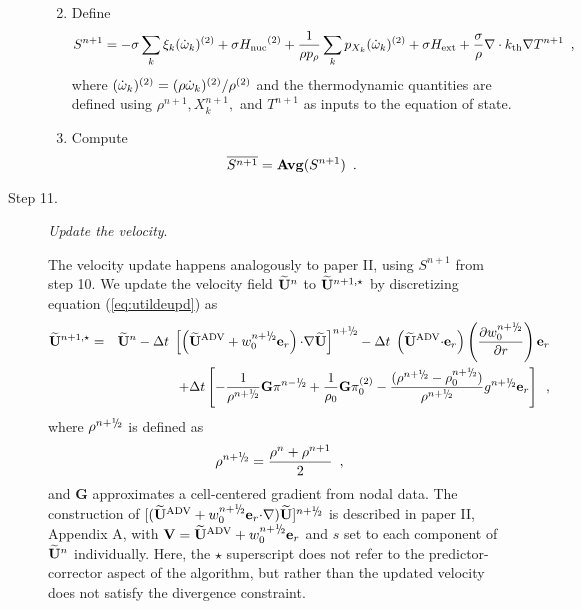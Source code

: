 \begin{description}
\begin{enumerate}
\renewcommand{\theenumi}{{\bf \alph{enumi}}}
\item Define
\begin{equation}
  S^{n+1} =  -\sigma  \sum_k  \xi_k (\dot{\omega}_k)^{(2)}  + \sigma {H_{\rm nuc}}^{(2)} +
  \frac{1}{\rho p_\rho} \sum_k p_{X_k}  ({\dot{\omega}}_k)^{(2)}  
   + \sigma {H_{\rm ext}} + \frac{\sigma}{\rho}\nabla\cdot k_{\rm th}\nabla T^{n+1} \enskip ,
\end{equation}
where $(\dot{\omega}_k)^{(2)} = (\rho \dot{\omega}_k)^{(2)} / \rho^{(2)}$
and the thermodynamic quantities are defined using $\rho^{n+1}, X_k^{n+1},$
and $T^{n+1}$ as inputs to the equation of state.

\item Compute
\begin{equation}
\overline{S^{n+1}} = {\mathrm{\bf Avg}} (S^{n+1}) \enskip.
\end{equation}

\end{enumerate}


\item[Step 11.] {\em Update the velocity}.  

The velocity update happens analogously to paper II, using $S^{n+1}$ from step 10.
We update the velocity field $\widetilde{{\bf U}}^n$ to $\widetilde{{\bf U}}^{n+1,\star}$ by discretizing 
equation (\ref{eq:utildeupd}) as
\begin{eqnarray}
\Ubt^{n+1,\star} &=& \Ubt^n - \dt \;
 \left[\left(\uadvtwo+ w_0^{\nph} \er\right) \cdotb \nablab \Ubt \right]^\nph
      - \dt \; \left(\uadvtwo \cdotb \er\right)  \left(\frac{\partial w_0^{\nph}}{\partial r} \right) \er \nonumber \\
   &&   + \dt \left[ - \frac{1}{\rho^\nph} {\mathbf{G}} \pi^\nmh
        + \frac{1}{\rho_0} {\mathbf{G}} \pizerotwo
        - \frac{(\rho^\nph-\rhozero^\nph)}{\rho^\nph} g^{n+\myhalf} \er \right] \enskip ,
\end{eqnarray}
where $\rho^{\nph}$ is defined as
\begin{equation}
\rho^\nph = \frac{\rho^n + \rho^{n+1}}{2}\enskip ,
\end{equation}
and $\mathbf{G}$ approximates a cell-centered gradient from nodal data.
The construction of $[(\uadvtwo+ w_0^{\nph} \er \cdotb \nablab) \Ubt ]^\nph$
is described in paper II, Appendix A, with $\Vb = \uadvtwo+w_0^{\nph} \er$ and $s$ 
set to each component of $\widetilde{{\bf U}}^n$ individually.  Here, the $\star$ superscript 
does not refer to the predictor-corrector aspect of the algorithm, but rather 
than the updated velocity does not satisfy the divergence constraint.


\end{description}
